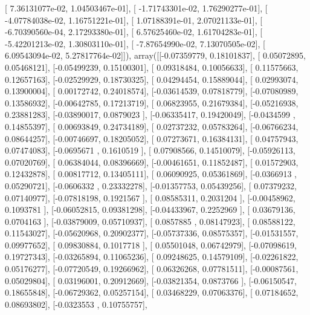 \documentclass{article}
\begin{document}
       [  7.36131077e-02,   1.04503467e-01],
       [ -1.71743301e-02,   1.76290277e-01],
       [ -4.07784038e-02,   1.16751221e-01],
       [  1.07188391e-01,   2.07021133e-01],
       [ -6.70390560e-04,   2.17293380e-01],
       [  6.57625460e-02,   1.61704283e-01],
       [ -5.42201213e-02,   1.30803110e-01],
       [ -7.87654990e-02,   7.13070505e-02],
       [  6.09543094e-02,   5.27817764e-02]]), array([[-0.07359779,  0.18101837],
       [ 0.05072895,  0.05468121],
       [-0.05499239,  0.15100301],
       [ 0.09318484,  0.10056633],
       [ 0.11575663,  0.12657163],
       [-0.02529929,  0.18730325],
       [ 0.04294454,  0.15889044],
       [ 0.02993074,  0.13900004],
       [ 0.00172742,  0.24018574],
       [-0.03614539,  0.07818779],
       [-0.07080989,  0.13586932],
       [-0.00642785,  0.17213719],
       [ 0.06823955,  0.21679384],
       [-0.05216938,  0.23881283],
       [-0.03890017,  0.0879023 ],
       [-0.06335417,  0.19420049],
       [-0.0434599 ,  0.14855397],
       [ 0.00693849,  0.24734189],
       [ 0.02737232,  0.05783264],
       [-0.06766234,  0.08644257],
       [-0.00746697,  0.18205052],
       [ 0.07273671,  0.16384131],
       [ 0.04757943,  0.07474083],
       [-0.0695671 ,  0.1610519 ],
       [ 0.07908566,  0.14510079],
       [-0.05926113,  0.07020769],
       [ 0.06384044,  0.08396669],
       [-0.00461651,  0.11852487],
       [ 0.01572903,  0.12432878],
       [ 0.00817712,  0.13405111],
       [ 0.06090925,  0.05361869],
       [-0.0366913 ,  0.05290721],
       [-0.0606332 ,  0.23332278],
       [-0.01357753,  0.05439256],
       [ 0.07379232,  0.07140977],
       [-0.07818198,  0.1921567 ],
       [ 0.08585311,  0.2031204 ],
       [-0.00458962,  0.1093781 ],
       [-0.06052815,  0.09381298],
       [-0.04433967,  0.2252969 ],
       [ 0.03679136,  0.0704163 ],
       [-0.03879009,  0.05710937],
       [ 0.0857885 ,  0.08147923],
       [ 0.08588122,  0.11543027],
       [-0.05620968,  0.20902377],
       [-0.05737336,  0.08575357],
       [-0.01531557,  0.09977652],
       [ 0.09830884,  0.1017718 ],
       [ 0.05501048,  0.06742979],
       [-0.07098619,  0.19727343],
       [-0.03265894,  0.11065236],
       [ 0.09248625,  0.14579109],
       [-0.02261822,  0.05176277],
       [-0.07720549,  0.19266962],
       [ 0.06326268,  0.07781511],
       [-0.00087561,  0.05029804],
       [ 0.03196001,  0.20912669],
       [-0.03821354,  0.0873766 ],
       [-0.06150547,  0.18655848],
       [-0.06729362,  0.05257154],
       [ 0.03468229,  0.07063376],
       [ 0.07184652,  0.08693802],
       [-0.0323553 ,  0.10755757],
\end{document}

